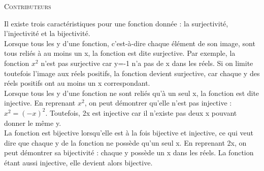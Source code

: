 \documentclass[10pt, french]{article}
\begin{document}
\begin{center}
	\textsc{\Large Contributeurs}\\[0.5cm] 
\end{center}

\newpage

\raggedcolumns

\begin{multicols*}{2}

\begin{definitionNOHFILL}

Il existe trois caractéristiques pour une fonction donnée : la surjectivité, l'injectivité et la bijectivité.\\

Lorsque tous les y d'une fonction, c'est-à-dire chaque élément de son image, sont tous reliés à au moins un x, la fonction est dite surjective. Par exemple, la fonction $x^{2}$ n'est pas surjective car y=-1 n'a pas de x dans les réels. Si on limite toutefois l'image aux réels positifs, la fonction devient surjective, car chaque y des réels positifs ont au moins un x correspondant.\\

Lorsque tous les y d'une fonction ne sont reliés qu'à un seul x, la fonction est dite injective. En reprenant $x^{2}$, on peut démontrer qu'elle n'est pas injective : $x^{2}=(-x)^{2}$. Toutefois, 2x est injective car il n'existe pas deux x pouvant donner le même y.\\

La fonction est bijective lorsqu'elle est à la fois bijective et injective, ce qui veut dire que chaque y de la fonction ne possède qu'un seul x. En reprenant 2x, on peut démontrer sa bijectivité : chaque y possède un x dans les réels. La fonction étant aussi injective, elle devient alors bijective.

\end{definitionNOHFILL}


\end{multicols*}
\end{document}
